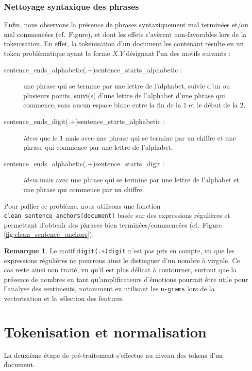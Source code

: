 \documentclass[12pt,a4paper]{report}
\theoremstyle{definition}
\newtheorem*{remark}{Remarque}
\begin{document}
\subsubsection{Nettoyage syntaxique des phrases}
Enfin, nous observons la présence de phrases syntaxiquement mal terminées et/ou mal commencées (cf.~Figure), et dont les effets s'avèrent non-favorables lors de la tokenisation. En effet, la tokenisation d'un document les contenant résulte en un token problématique ayant la forme $X.Y$ désignant l'un des motifs suivants :
\begin{description}
  \item[sentence\_ends\_alphabetic(.+)sentence\_starts\_alphabetic :] une phrase qui se termine par une lettre de l'alphabet, suivie d'un ou plusieurs points, suivi(s) d'une lettre de l'alphabet d'une phrase qui commence, sans aucun espace blanc entre la fin de la $1$\iere{} et le début de la $2$\ieme{}.
  \item[sentence\_ends\_digit(.+)sentence\_starts\_alphabetic :] \emph{idem} que le $1$\ier{} mais avec une phrase qui se termine par un chiffre et une phrase qui commence par une lettre de l'alphabet.
  \item[sentence\_ends\_alphabetic(.+)sentence\_starts\_digit :] \emph{idem} mais avec une phrase qui se termine par une lettre de l'alphabet et une phrase qui commence par un chiffre.
\end{description}

\noindent Pour pallier ce problème, nous utilisons une fonction \texttt{clean\_sentence\_anchors(document)} basée sur des expressions régulières et permettant d'obtenir des phrases bien terminées/commencées (cf.~Figure \ref{fig:clean_sentence_anchors}).

\begin{remark}
  Le motif \texttt{digit(.+)digit} n'est pas pris en compte, vu que les expressions régulières ne pourrons ainsi le distinguer d'un nombre à virgule. Ce cas reste ainsi non traité, vu qu'il est plus délicat à contourner, surtout que la présence de nombres en tant qu'amplificateurs d'émotions pourrait être utile pour l'analyse des sentiments, notamment en utilisant les \texttt{n-grams} lors de la vectorisation et la sélection des features.
\end{remark}

\section{Tokenisation et normalisation}
La deuxième étape de pré-traitement s'effectue au niveau des tokens d'un document.
\end{document}
